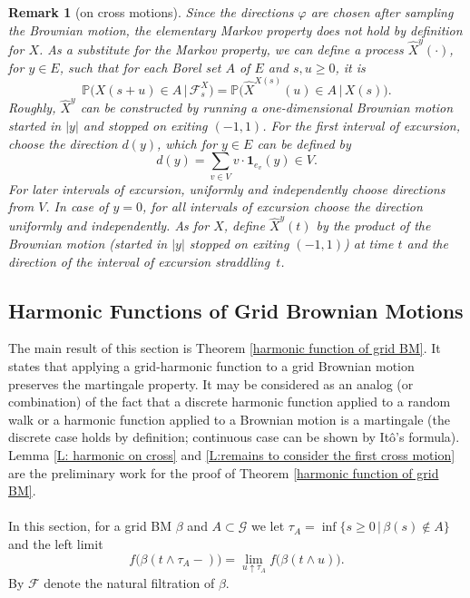 \documentclass[11pt]{article}
\numberwithin{equation}{section}
\def\indicator{\boldsymbol{1}}
\def\mydot{\boldsymbol{\cdot}}
\newtheorem*{remark}{Remark}
\begin{document}
\begin{remark}[on cross motions]
  Since the directions $\varphi$ are chosen after sampling 
  the Brownian motion, the elementary Markov property 
  does not hold by definition for $X$. 
  As a substitute for the Markov property, we 
  can define a process 
  $\hat{X}^y(\mydot)$, for $y \in E$, such that 
  for each Borel set $A$ of $E$ and $s,u \geq 0$, it is 
  \begin{equation} \label{eq: def of hat X}
      \mathbb{P}\big(X(s+u) \in A 
      \,\big|\, \mathcal{F}^X_s \big) =
      \mathbb{P} \big( \hat{X}^{X(s)}(u) \in A 
        \,\big|\, X(s) \big).
    \end{equation}
  Roughly, $\hat{X}^y$ can be constructed by
  running a one-dimensional Brownian motion started in 
  $|y|$ and stopped on exiting $(-1,1)$. For the 
  first interval of excursion, choose the 
  direction $d(y)$, which for $y \in E$ can be defined by 
  \begin{equation}
    \label{D: direction d}
    \nonumber
    d(y) = \sum_{v \in V} v \cdot \indicator_{e_v}(y) \in V.
  \end{equation}
  For later intervals of excursion, 
  uniformly and independently choose directions from $V$.
  In case of $y = 0$, for all intervals 
  of excursion choose the direction uniformly and independently.
  As for $X$, define $\hat{X}^y(t)$ by the product of the Brownian motion 
  (started in $|y|$ stopped on exiting $(-1,1)$) at time 
  $t$ and the direction of the interval of excursion \hbox{straddling $t$.}
\end{remark}


\subsection{Harmonic Functions of Grid Brownian Motions} 
\label{sec: ham of grid BM}
The main result of this section is Theorem \ref{harmonic function of grid BM}. 
It states that applying a grid-harmonic function to a
grid Brownian motion preserves the martingale property. 
It may be considered as an analog (or combination)
of the fact that a discrete harmonic function applied 
to a random walk or a harmonic function applied to a Brownian motion is a martingale 
(the discrete case holds by definition; continuous case can be shown by Itô's formula). 
Lemma \ref{L: harmonic on cross} and \ref{L:remains to consider the first cross motion} 
are the preliminary work for the proof of Theorem \ref{harmonic function of grid BM}. 
\\~\\
In this section, for a grid BM $\beta$ and 
$A \subset \mathcal{G}$ we let 
\hbox{$\tau_A = \inf \{s \geq 0 \,|\, \beta(s) \notin A\}$}
and the left limit  
\begin{equation}\nonumber
  f \big(\beta(t \land \tau_A -) \big) = 
 \lim_{u \uparrow \tau_A} 
    f \big(\beta(t \land u) \big).
\end{equation}
By $\mathcal{F}$ denote the natural 
filtration of $\beta$.
\end{document}
